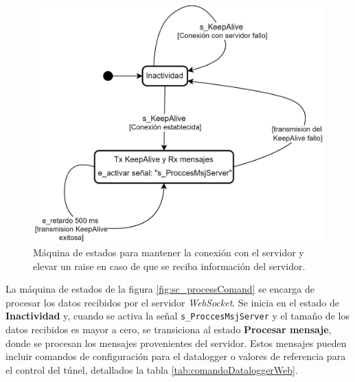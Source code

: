 

\begin{figure}[H]
    \centering
    \includegraphics[width=0.7\linewidth]{Figuras/datalogger/Firmware/sc_keepAlive.png}
    \caption{Máquina de estados para mantener la conexión con el servidor y elevar un raise en caso de que se reciba información del servidor.}
    \label{fig:sc_keepAlive}
\end{figure}



La máquina de estados de la figura \ref{fig:sc_processComand} se encarga de procesar los datos recibidos por el servidor \textit{WebSocket}. Se inicia en el estado de \textbf{Inactividad} y, cuando se activa la señal \texttt{s\_ProccesMsjServer} y el tamaño de los datos recibidos es mayor a cero, se transiciona al estado \textbf{Procesar mensaje}, donde se procesan los mensajes provenientes del servidor. Estos mensajes pueden incluir comandos de configuración para el datalogger o valores de referencia para el control del túnel, detallados la tabla \ref{tab:comandoDataloggerWeb}.

